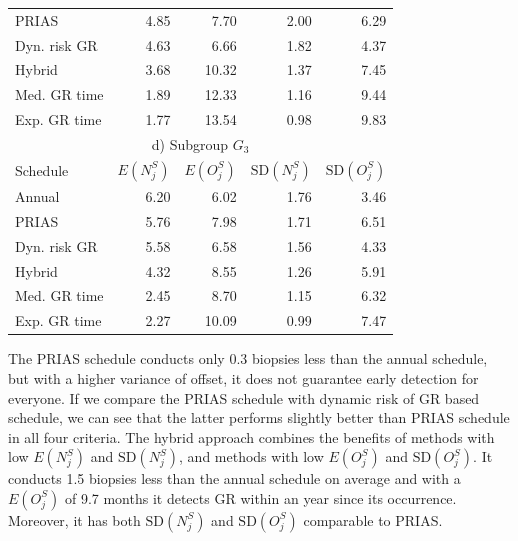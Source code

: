 \begin{table}
\begin{tabular}{lrrrr}
PRIAS          & 4.85            & 7.70                & 2.00          & 6.29        \\
Dyn. risk GR       & 4.63            & 6.66                & 1.82          & 4.37              \\
Hybrid       & 3.68            & 10.32                & 1.37          & 7.45              \\
Med. GR time & 1.89             & 12.33               & 1.16          & 9.44              \\
Exp. GR time & 1.77            & 13.54               & 0.98          & 9.83              \\
\hline      
\multicolumn{5}{c}{d) Subgroup $G_3$}\\
\hline
Schedule        & $E(N^S_j)$ & $E(O^S_j)$ & ${\mbox{SD}(N^S_j)}$ & ${\mbox{SD}(O^S_j)}$ \\
\hline
Annual         & 6.20             & 6.02                & 1.76          & 3.46              \\
PRIAS          & 5.76             & 7.98                & 1.71         & 6.51        \\
Dyn. risk GR       & 5.58            & 6.58                & 1.56          & 4.33              \\
Hybrid       & 4.32            & 8.55                & 1.26          & 5.91              \\
Med. GR time & 2.45            & 8.70                & 1.15          & 6.32              \\
Exp. GR time & 2.27            & 10.09               & 0.99          & 7.47              \\
\hline     
\end{tabular}
\end{table}

The PRIAS schedule conducts only 0.3 biopsies less than the annual schedule, but with a higher variance of offset, it does not guarantee early detection for everyone. If we compare the PRIAS schedule with dynamic risk of GR based schedule, we can see that the latter performs slightly better than PRIAS schedule in all four criteria. The hybrid approach combines the benefits of methods with low $E(N^S_j)$ and $\mbox{SD}(N^S_j)$, and methods with low $E(O^S_j)$ and $\mbox{SD}(O^S_j)$. It conducts 1.5 biopsies less than the annual schedule on average and with a $E(O^S_j)$ of 9.7 months it detects GR within an year since its occurrence. Moreover, it has both $\mbox{SD}(N^S_j)$ and $\mbox{SD}(O^S_j)$ comparable to PRIAS.

